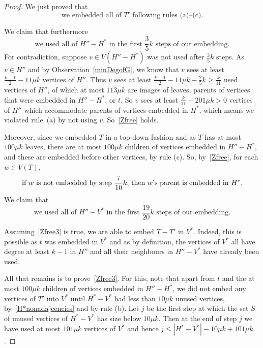 \documentclass[12pt]{article}
\begin{document}
\begin{proof}
We just proved that
\begin{equation}\label{allofT}
\text{we embedded all of $T'$ following rules (a)--(c).}
\end{equation}

We claim that furthermore
\begin{equation}\label{Zfree}
\text{we used all of $H''-H^*$ in the first $\frac{3}{5}k$ steps of our
embedding.}
\end{equation}
For contradiction, suppose $v\in V(H''-H^*)$ was not used after $\frac{3}{5} k$ steps. As $v\in H''$ and by Observation~\ref{minDegofG}, we know that $v$ sees at least $\frac{k-1}2-11\mu k$ vertices of $H''$. Thus $v$ sees at least $\frac{k-1}2-11\mu k-\frac 25k\ge\frac k{11}$ used vertices of $H''$, of which at most $113\mu k$ are  images of  leaves,  parents of vertices that were embedded in $H''-H^*$, or $t$. 
So $v$ sees at least $\frac k{11}-201\mu k>0$ vertices of $H''$ which accommodate 
 parents of vertices embedded in $H^*$, which means we violated rule~(a) by not using $v$. So~\eqref{Zfree} holds.
 
 Moreover, since we embedded $T$ in a top-down fashion and 
 as $T$ has at most $100\mu k$ leaves, there are at most  $100\mu k$ children of vertices embedded in $H''-H^*$, and these are embedded before other vertices, by rule (c).   So, by~\eqref{Zfree}, for each $w\in V(T)$, 
\begin{align}\label{Zfree2}
\hskip-.1cm\text{
if $w$ is not embedded 
by step $\frac{7}{10} k$, then $w$'s parent is embedded in $H^*$.}
\end{align}
 We claim that 
\begin{equation}\label{Zfree3}
\text{we used all of $H''-V^*$ in the first $\frac{19}{20} k$ steps of our
embedding.}
\end{equation}

Assuming~\eqref{Zfree3} is true, 
 we are able to embed $T-T'$ in $V^*$. Indeed, this is possible as $t$ was embedded in $V^*$ and as by definition, the vertices of $V^*$ all  have degree at least $k-1$ in $H''$ and all their neighbours in $H''-V^*$ have already been used.

All that remains is to prove~\eqref{Zfree3}. 
For this, note that apart from $t$ and  the at most $100\mu k$ children of vertices embedded in $H''-H^*$, we did not embed any vertices of $T'$ into $V^*$ until $H^*-V^*$ had less than $10\mu k$ unused vertices, by~\eqref{H*nonadajcencies} and by rule (b). Let $j$ be the first step  at which the set $S$ of unused vertices of
$H^*-V^*$  has size below $10 \mu k$. 
Then at the end of step $j$ we have used at most $101 \mu k$ vertices of $V^*$ 
and hence $j \le  |H^*-V^*|-10\mu k +101\mu k$. 



\end{proof}
\end{document}
